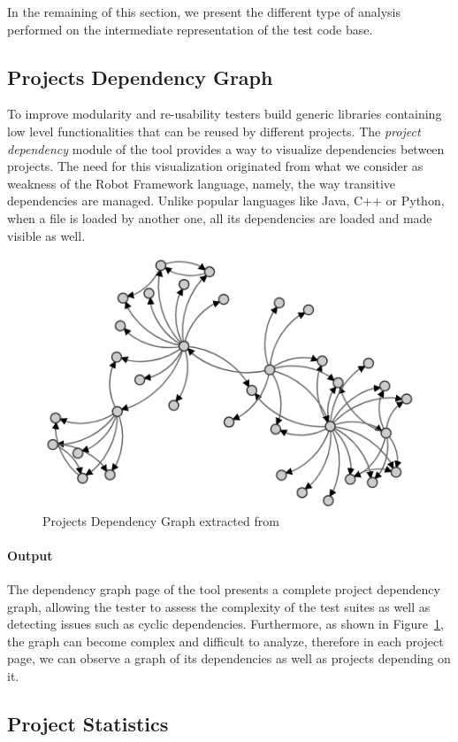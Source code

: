 In the remaining of this section, we present the different type of analysis performed on the intermediate representation of the test code base.

\subsection{Projects Dependency Graph}
\label{sec:dependency-graph}

To improve modularity and re-usability testers build generic libraries containing low level functionalities that can be reused by different projects. The \emph{project dependency} module of the tool provides a way to visualize dependencies between projects. The need for this visualization originated from what we consider as weakness of the Robot Framework language, namely, the way transitive dependencies are managed. Unlike popular languages like Java, C++ or Python, when a file is loaded by another one, all its dependencies are loaded and made visible as well.  

\begin{figure}[t!]
\centering
\includegraphics[width=0.5\columnwidth]{figures/ikora/dependency-graph.png}
\caption{Projects Dependency Graph extracted from \tool}
\label{fig:dependency-graph}
\end{figure}

\paragraph{Output} The dependency graph page of the tool presents a complete project dependency graph, allowing the tester to assess the complexity of the test suites as well as detecting issues such as cyclic dependencies. Furthermore, as shown in Figure~\ref{fig:dependency-graph}, the graph can become complex and difficult to analyze, therefore in each project page, we can observe a graph of its dependencies as well as projects depending on it.

\subsection{Project Statistics}


